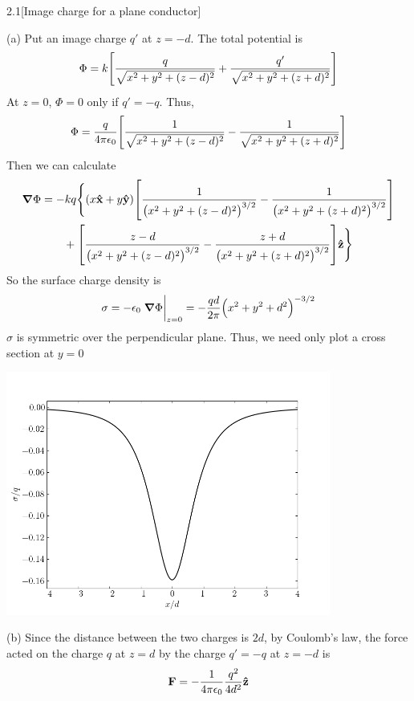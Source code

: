 \documentclass[12pt]{article}
\begin{document}
\begin{problem}{2.1}[Image charge for a plane conductor]
\begin{solution}
(a) Put an image charge $q'$ at $z=-d$. The total potential is
\begin{equation}
    \Phi=k\qty[
        \frac{q}{\sqrt{x^2+y^2+(z-d)^2}}
        +\frac{q'}{\sqrt{x^2+y^2+(z+d)^2}}
    ] 
\end{equation}
At $z=0$, $\Phi=0$ only if $q'=-q$. Thus,
\begin{equation}
    \Phi=\frac{q}{4\pi\epsilon_0}\qty[
    \frac{1}{\sqrt{x^2+y^2+(z-d)^2}}-\frac1{\sqrt{x^2+y^2+(z+d)^2}}
    ] 
\end{equation}
Then we can calculate
\begin{align}
    \grad\Phi
    &=-kq\Bigg\{
        \qty(x\vb{\hat{x}}+y\vb{\hat{y}})
        \qty[
            \frac1{\qty(x^2+y^2+(z-d)^2)^{3/2}}
            -\frac1{\qty(x^2+y^2+(z+d)^2)^{3/2}}
        ]\notag\\
    &\qquad+\qty[
        \frac{z-d}{\qty(x^2+y^2+(z-d)^2)^{3/2}}
        -\frac{z+d}{\qty(x^2+y^2+(z+d)^2)^{3/2}}
    ]\vb{\hat{z}}
    \Bigg\}
\end{align}
So the surface charge density is
\begin{equation}\label{p1a:sigma}
    \sigma=-\epsilon_0\eval{\grad\Phi}_{z=0}
    =-\frac{qd}{2\pi}\qty(x^2+y^2+d^2)^{-3/2}
\end{equation}
$\sigma$ is symmetric over the perpendicular plane. Thus, we need only plot a
cross section at $y=0$
\begin{center}
    \includegraphics[width=0.8\textwidth]{p1a.png} 
\end{center}

(b) Since the distance between the two charges is $2d$, by Coulomb's law, the
force acted on the charge $q$ at $z=d$ by the charge $q'=-q$ at $z=-d$ is
\begin{equation}
    \vb{F}=-\frac1{4\pi\epsilon_0}\frac{q^2}{4d^2}\vb{\hat{z}} 
\end{equation}


\end{solution}
\end{problem}
\end{document}
